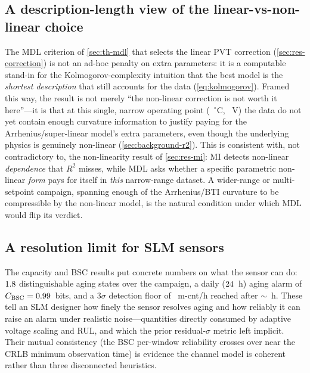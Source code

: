 \subsection{A description-length view of the linear-vs-non-linear choice}
The MDL criterion of \cref{sec:th-mdl} that selects the linear PVT correction
(\cref{sec:res-correction}) is not an ad-hoc penalty on extra parameters: it is
a computable stand-in for the Kolmogorov-complexity intuition that the best
model is the \emph{shortest description} that still accounts for the data
(\cref{eq:kolmogorov}). Framed this way, the result is not merely ``the
non-linear correction is not worth it here''---it is that at this single,
narrow operating point (\valDutTempMean~$^\circ$C, \valDutVoltMean~V) the
data do not yet contain enough curvature information to justify paying for the
Arrhenius/super-linear model's extra parameters, even though the underlying
physics is genuinely non-linear (\cref{sec:background-r2}). This is consistent
with, not contradictory to, the non-linearity result of \cref{sec:res-mi}: MI
detects non-linear \emph{dependence} that $R^2$ misses, while MDL asks whether
a specific parametric non-linear \emph{form} pays for itself in \emph{this}
narrow-range dataset. A wider-range or multi-setpoint campaign, spanning enough
of the Arrhenius/BTI curvature to be compressible by the non-linear model, is
the natural condition under which MDL would flip its verdict.

\subsection{A resolution limit for SLM sensors}
The capacity and BSC results put concrete numbers on what the sensor can do:
$1.8$ distinguishable aging states over the campaign, a daily
($24$~h) aging alarm of $C_{\mathrm{BSC}}=0.99$~bits, and a $3\sigma$
detection floor of \valMinDetectRate~m-cnt/h reached after $\sim$\valMinObsTime~h.
These tell an SLM designer how finely the sensor resolves aging and how reliably
it can raise an alarm under realistic noise---quantities directly consumed by
adaptive voltage scaling and RUL, and which the prior residual-$\sigma$ metric
left implicit. Their mutual consistency (the BSC per-window reliability crosses
over near the CRLB minimum observation time) is evidence the channel model is
coherent rather than three disconnected heuristics.

